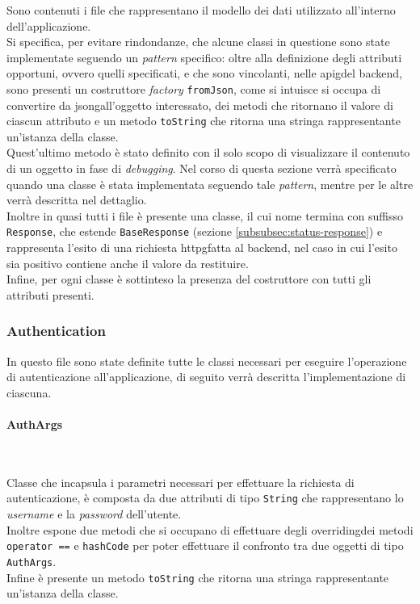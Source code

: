 Sono contenuti i file che rappresentano il modello dei dati utilizzato all'interno dell'applicazione.\\
Si specifica, per evitare rindondanze, che alcune classi in questione sono state implementate seguendo un \emph{pattern} specifico: oltre alla definizione degli attributi opportuni, ovvero quelli specificati, e che sono vincolanti, nelle \gls{apig}\glsoccur del \gls{backend}\glsoccur, sono presenti un costruttore \emph{factory}\cite{site:factory} \lstinline{fromJson}, come si intuisce si occupa di convertire da \gls{jsong}\glsoccur all'oggetto interessato, dei metodi che ritornano il valore di ciascun attributo e un metodo \lstinline{toString} che ritorna una stringa rappresentante un'istanza della classe.\\
Quest'ultimo metodo è stato definito con il solo scopo di visualizzare il contenuto di un oggetto in fase di \emph{debugging}.
Nel corso di questa sezione verrà specificato quando una classe è stata implementata seguendo tale \emph{pattern}, mentre per le altre verrà descritta nel dettaglio. \\
Inoltre in quasi tutti i file è presente una classe, il cui nome termina con suffisso \lstinline{Response}, che estende \lstinline{BaseResponse} (sezione \ref{subsubsec:status-response}) e rappresenta l'esito di una richiesta \gls{httpg}\glsoccur fatta al \gls{backend}\glsoccur, nel caso in cui l'esito sia positivo contiene anche il valore da restituire.\\
Infine, per ogni classe è sottinteso la presenza del costruttore con tutti gli attributi presenti. 

\subsubsection*{Authentication}
\label{subsubsec:authentication}

In questo file sono state definite tutte le classi necessari per eseguire l'operazione di autenticazione all'applicazione, di seguito verrà descritta l'implementazione di ciascuna.

\paragraph*{AuthArgs} ~ \\
\label{par:auth-args}

\noindent Classe che incapsula i parametri necessari per effettuare la richiesta di autenticazione, è composta da due attributi di tipo \lstinline{String} che rappresentano lo \emph{username} e la \emph{password} dell'utente.\\
Inoltre espone due metodi che si occupano di effettuare degli \gls{overriding}\glsoccur dei metodi \lstinline{operator ==}\cite{site:operator-equals} e \lstinline{hashCode}\cite{site:hascode-property} per poter effettuare il confronto tra due oggetti di tipo \lstinline{AuthArgs}.\\
Infine è presente un metodo \lstinline{toString} che ritorna una stringa rappresentante un'istanza della classe.

